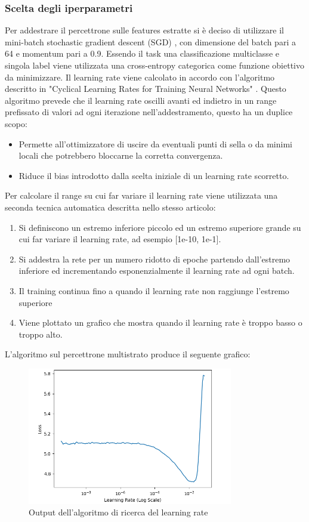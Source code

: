 \subsubsection{Scelta degli iperparametri}
Per addestrare il percettrone sulle features estratte si è deciso di utilizzare il mini-batch stochastic gradient descent (SGD) \cite{kiefer1952}, con dimensione del batch pari a 64 e momentum pari a 0.9.
Essendo il task una classificazione multiclasse e singola label viene utilizzata una cross-entropy categorica come funzione obiettivo da minimizzare.
Il learning rate viene calcolato in accordo con l'algoritmo descritto in "Cyclical Learning Rates for Training Neural Networks" \cite{smith2015cyclical}.
Questo algoritmo prevede che il learning rate oscilli avanti ed indietro in un range prefissato di valori ad ogni iterazione nell'addestramento, questo ha un duplice scopo:
\begin{itemize}
\item Permette all'ottimizzatore di uscire da eventuali punti di sella o da minimi locali che potrebbero bloccarne la corretta convergenza.
\item Riduce il bias introdotto dalla scelta iniziale di un learning rate scorretto.
\end{itemize}
Per calcolare il range su cui far variare il learning rate viene utilizzata una seconda tecnica automatica descritta nello stesso articolo:
\begin{enumerate}
\item Si definiscono un estremo inferiore piccolo ed un estremo superiore grande su cui far variare il learning rate, ad esempio [1e-10, 1e-1].
\item Si addestra la rete per un numero ridotto di epoche partendo dall'estremo inferiore ed incrementando esponenzialmente il learning rate ad ogni batch.
\item Il training continua fino a quando il learning rate non raggiunge l'estremo superiore
\item Viene plottato un grafico che mostra quando il learning rate è troppo basso o troppo alto.
\end{enumerate} 
L'algoritmo sul percettrone multistrato produce il seguente grafico:
\begin{figure}[ht]
\centering
\includegraphics[width=0.8\textwidth]{images/baseline/lrfind_plot.png} 
\caption{Output dell'algoritmo di ricerca del learning rate}
\label{fig_baseline_finder}
\vspace{-15mm}
\end{figure}
